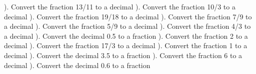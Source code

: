 \documentclass{article}%
\begin{document}
\newline%
). Convert the fraction 13/11 to a decimal%
\newline%
\newline%
). Convert the fraction 10/3 to a decimal%
\newline%
\newline%
). Convert the fraction 19/18 to a decimal%
\newline%
\newline%
). Convert the fraction 7/9 to a decimal%
\newline%
\newline%
). Convert the fraction 5/9 to a decimal%
\newline%
\newline%
). Convert the fraction 4/3 to a decimal%
\newline%
\newline%
). Convert the decimal 0.5 to a fraction%
\newline%
\newline%
). Convert the fraction 2 to a decimal%
\newline%
\newline%
). Convert the fraction 17/3 to a decimal%
\newline%
\newline%
). Convert the fraction 1 to a decimal%
\newline%
\newline%
). Convert the decimal 3.5 to a fraction%
\newline%
\newline%
). Convert the fraction 6 to a decimal%
\newline%
\newline%
). Convert the decimal 0.6 to a fraction%
\newline%
\newline%
\newline%
\end{document}

